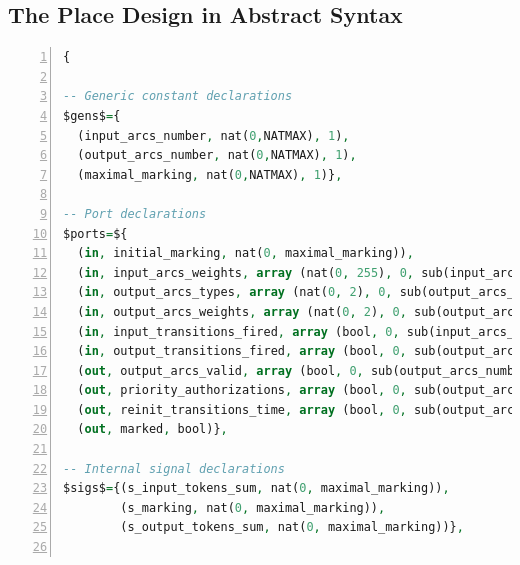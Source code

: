 \documentclass[pdflatex,sn-mathphys]{sn-jnl}%
\theoremstyle{thmstyleone}%
\theoremstyle{thmstyletwo}%
\theoremstyle{thmstylethree}%
\begin{document}


% 
% 
% 
% 
% 
% 

\clearpage
\begin{appendices}

\section{The Place Design in Abstract \hvhdl{} Syntax}
\label{app:place-design}

\begin{lstlisting}[language=VHDL,
  label={lst:place-design-abss},
  caption={The \texttt{place} design in \hvhdl{} abstract syntax.},
  basicstyle=\fontsize{8}{10}\selectfont,
  framexleftmargin=1.5em,
  xleftmargin=2em,
  numbers=left,
  numberstyle=\tiny\ttfamily]
{
    
-- Generic constant declarations
$gens$={
  (input_arcs_number, nat(0,NATMAX), 1), 
  (output_arcs_number, nat(0,NATMAX), 1),
  (maximal_marking, nat(0,NATMAX), 1)},

-- Port declarations
$ports=${
  (in, initial_marking, nat(0, maximal_marking)),
  (in, input_arcs_weights, array (nat(0, 255), 0, sub(input_arcs_number, 1))),
  (in, output_arcs_types, array (nat(0, 2), 0, sub(output_arcs_number, 1))),
  (in, output_arcs_weights, array (nat(0, 2), 0, sub(output_arcs_number, 1))),
  (in, input_transitions_fired, array (bool, 0, sub(input_arcs_number, 1))),          
  (in, output_transitions_fired, array (bool, 0, sub(output_arcs_number, 1))),
  (out, output_arcs_valid, array (bool, 0, sub(output_arcs_number, 1))),
  (out, priority_authorizations, array (bool, 0, sub(output_arcs_number, 1))),
  (out, reinit_transitions_time, array (bool, 0, sub(output_arcs_number, 1))),
  (out, marked, bool)},
  
-- Internal signal declarations
$sigs$={(s_input_tokens_sum, nat(0, maximal_marking)),
        (s_marking, nat(0, maximal_marking)),
        (s_output_tokens_sum, nat(0, maximal_marking))},
       

\end{lstlisting}
\end{appendices}
\end{document}
